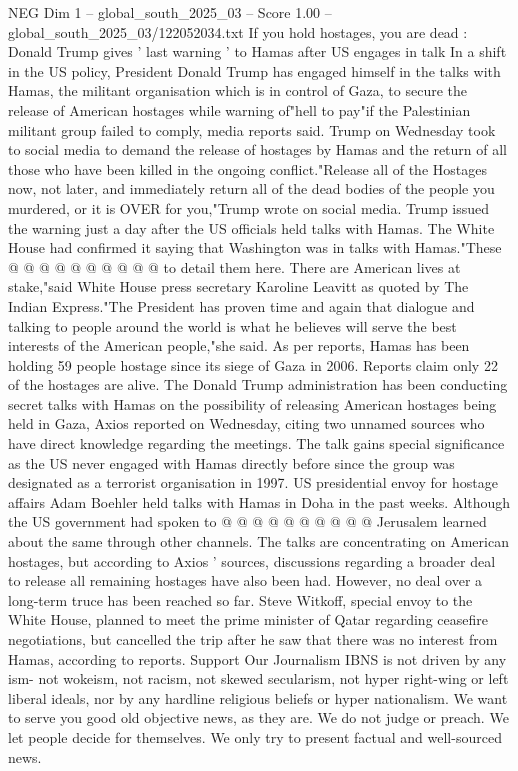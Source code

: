 \begin{textsample}{NEG Dim 1 – global\_south\_2025\_03 – Score 1.00 – global\_south\_2025\_03/122052034.txt}  \label{ex:f1_neg_180}
If you hold hostages, you are dead : Donald Trump gives ' last warning ' to Hamas after US engages in talk In a shift in the US policy, President Donald Trump has engaged himself in the talks with Hamas, the militant organisation which is in control of Gaza, to secure the release of American hostages while warning of"hell to pay"if the Palestinian militant group failed to comply, media reports said.
Trump on Wednesday took to social media to demand the release of hostages by Hamas and the return of all those who have been killed in the ongoing conflict."Release all of the Hostages now, not later, and immediately return all of the dead bodies of the people you murdered, or it is OVER for you,"Trump wrote on social media.
Trump issued the warning just a day after the US officials held talks with Hamas.
The White House had confirmed it saying that Washington was in talks with Hamas."These @ @ @ @ @ @ @ @ @ @ to detail them here.
There are American lives at stake,"said White House press secretary Karoline Leavitt as quoted by The Indian Express."The President has proven time and again that dialogue and talking to people around the world is what he believes will serve the best interests of the American people,"she said.
As per reports, Hamas has been holding 59 people hostage since its siege of Gaza in 2006.
Reports claim only 22 of the hostages are alive.
The Donald Trump administration has been conducting secret talks with Hamas on the possibility of releasing American hostages being held in Gaza, Axios reported on Wednesday, citing two unnamed sources who have direct knowledge regarding the meetings.
The talk gains special significance as the US never engaged with Hamas directly before since the group was designated as a terrorist organisation in 1997.
US presidential envoy for hostage affairs Adam Boehler held talks with Hamas in Doha in the past weeks.
Although the US government had spoken to @ @ @ @ @ @ @ @ @ @ Jerusalem learned about the same through other channels.
The talks are concentrating on American hostages, but according to Axios ' sources, discussions regarding a broader deal to release all remaining hostages have also been had.
However, no deal over a long-term truce has been reached so far.
Steve Witkoff, special envoy to the White House, planned to meet the prime minister of Qatar regarding ceasefire negotiations, but cancelled the trip after he saw that there was no interest from Hamas, according to reports.
Support Our Journalism IBNS is not driven by any ism- not wokeism, not racism, not skewed secularism, not hyper right-wing or left liberal ideals, nor by any hardline religious beliefs or hyper nationalism.
We want to serve you good old objective news, as they are.
We do not judge or preach.
We let people decide for themselves.
We only try to present factual and well-sourced news.

\end{textsample}
